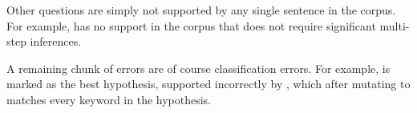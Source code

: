 Other questions are simply not supported by any single sentence in the corpus.
For example,  has
  no support in the corpus that does not require significant multi-step inferences.

A remaining chunk of errors are of course classification errors.
For example, 
  is marked as the best hypothesis, supported incorrectly by 
  ,
  which after mutating  to  matches every keyword in the
  hypothesis.
  


